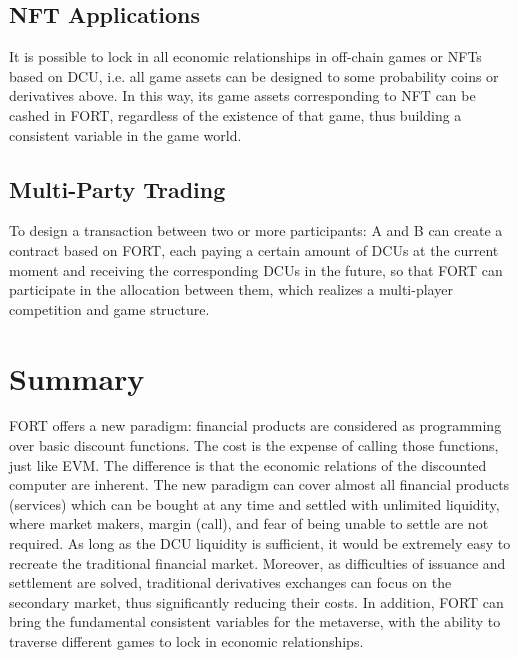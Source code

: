 \documentclass[letterpaper,12pt]{article}
\begin{document}
\subsection{NFT Applications}

It is possible to lock in all economic relationships in off-chain games or NFTs based on DCU, i.e. all game assets can be designed to some probability coins or derivatives above. 
In this way, its game assets corresponding to NFT can be cashed in FORT, regardless of the existence of that game, thus building a consistent variable in the game world.

\subsection{Multi-Party Trading}

To design a transaction between two or more participants: A and B can create a contract based on FORT, each paying a certain amount of DCUs at the current moment and receiving the corresponding DCUs in the future, so that FORT can participate in the allocation between them, which realizes a multi-player competition and game structure.

\section{Summary}

FORT offers a new paradigm: financial products are considered as programming over basic discount functions. 
The cost is the expense of calling those functions, just like EVM. The difference is that the economic relations of the discounted computer are inherent. 
The new paradigm can cover almost all financial products (services) which can be bought at any time and settled with unlimited liquidity, where market makers, margin (call), and fear of being unable to settle are not required. 
As long as the DCU liquidity is sufficient, it would be extremely easy to recreate the traditional financial market. 
Moreover, as difficulties of issuance and settlement are solved, traditional derivatives exchanges can focus on the secondary market, thus significantly reducing their costs. 
In addition, FORT can bring the fundamental consistent variables for the metaverse, with the ability to traverse different games to lock in economic relationships.


\end{document}
